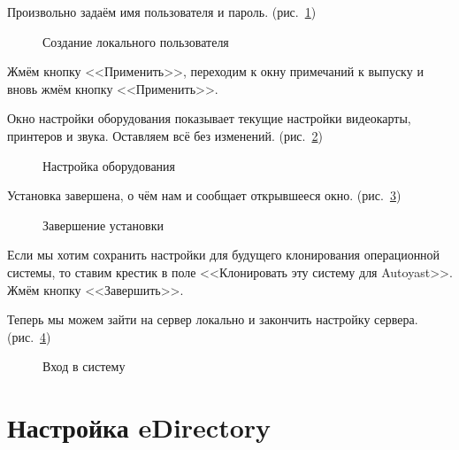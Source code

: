 Произвольно задаём имя пользователя и пароль. (рис.~\ref{fig13})
\begin{figure}[H]
\caption{Создание локального пользователя}
\label{fig13}
\end{figure}
Жмём кнопку <<Применить>>, переходим к окну примечаний к выпуску и вновь жмём кнопку <<Применить>>.
\clearpage

Окно настройки оборудования показывает текущие настройки видеокарты, принтеров и звука. Оставляем всё без изменений. (рис.~\ref{fig14})
\begin{figure}[H]
\caption{Настройка оборудования}
\label{fig14}
\end{figure}
\clearpage

Установка завершена, о чём нам и сообщает открывшееся окно. (рис.~\ref{fig15})
\begin{figure}[H]
\caption{Завершение установки}
\label{fig15}
\end{figure}
Если мы хотим сохранить настройки для будущего клонирования операционной
системы, то ставим крестик в поле <<Клонировать эту систему для Autoyast>>. Жмём кнопку <<Завершить>>.
\clearpage

Теперь мы можем зайти на сервер локально и закончить настройку сервера. (рис.~\ref{fig16})
\begin{figure}[H]
\caption{Вход в систему}
\label{fig16}
\end{figure}
\clearpage

\section{Настройка eDirectory}

